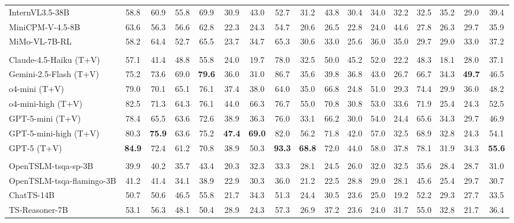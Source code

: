 \documentclass{article}
\theoremstyle{plain}
\theoremstyle{definition}
\theoremstyle{remark}
\theoremstyle{plain}
\begin{document}
\begin{table}[t]
{\begin{tabular}{l|cccc|ccccccc|cc|cc|c}
\rowcolor{green!10}
InternVL3.5-38B & 58.8 & 60.9 & 55.8 & 69.9 & 30.9 & 43.0 & 52.7 & 31.2 & 43.8 & 30.4 & 34.0 & 32.2 & 32.5 & 35.2 & 29.0 & 39.4 \\
\rowcolor{green!10}
MiniCPM-V-4.5-8B & 63.6 & 56.3 & 56.6 & 62.8 & 22.3 & 24.3 & 54.7 & 20.6 & 26.5 & 22.8 & 24.0 & 44.6 & 27.8 & 26.3 & 29.7 & 35.9 \\
\rowcolor{green!10}
MiMo-VL-7B-RL & 58.2 & 64.4 & 52.7 & 65.5 & 23.7 & 34.7 & 65.3 & 30.6 & 33.0 & 25.6 & 36.0 & 35.0 & 29.7 & 29.0 & 33.0 & 37.2 \\
\midrule
\rowcolor{gray!20} \multicolumn{17}{c}{\textit{Both Visual \& Textual Time Series as Input}} \\\midrule
\rowcolor{blue!10}
Claude-4.5-Haiku (T+V) & 57.1 & 41.4 & 48.8 & 55.8 & 24.0 & 19.7 & 78.0 & 32.5 & 50.0 & 45.2 & 52.0 & 22.2 & 48.3 & 18.1 & 28.0 & 37.1 \\
\rowcolor{blue!10}
Gemini-2.5-Flash (T+V) & 75.2 & 73.6 & 69.0 & \textbf{79.6} & 36.0 & 31.0 & 86.7 & 35.6 & 39.8 & 36.8 & 43.0 & 26.7 & 66.7 & 34.3 & \textbf{49.7} & 46.5 \\
\rowcolor{blue!10}
o4-mini (T+V) & 79.0 & 70.1 & 65.1 & 76.1 & 37.4 & 38.0 & 64.0 & 35.0 & 66.8 & 24.8 & 51.0 & 29.3 & 74.4 & 29.9 & 36.0 & 48.2 \\
\rowcolor{blue!10}
o4-mini-high (T+V) & 82.5 & 71.3 & 64.3 & 76.1 & 44.0 & 66.3 & 76.7 & 55.0 & 70.8 & 30.8 & 53.0 & 33.6 & 71.9 & 25.4 & 24.3 & 52.5 \\
\rowcolor{blue!10}
GPT-5-mini (T+V) & 78.4 & 65.5 & 63.6 & 72.6 & 38.9 & 36.3 & 76.0 & 33.1 & 66.2 & 30.0 & 54.0 & 24.4 & 65.6 & 34.3 & 29.7 & 46.9 \\
\rowcolor{blue!10}
GPT-5-mini-high (T+V) & 80.3 & \textbf{75.9} & 63.6 & 75.2 & \textbf{47.4} & \textbf{69.0} & 82.0 & 56.2 & 71.8 & 42.0 & 57.0 & 32.5 & 68.9 & 32.8 & 24.3 & 54.1 \\
\rowcolor{blue!10}
GPT-5 (T+V) & \textbf{84.9} & 72.4 & 61.2 & 70.8 & 38.9 & 50.3 & \textbf{93.3} & \textbf{68.8} & 72.0 & 44.0 & 58.0 & 37.8 & 78.1 & 31.9 & 34.3 & \textbf{55.6} \\
\midrule
\rowcolor{gray!20} \multicolumn{17}{c}{\textit{Embedded Time Series as Input}} \\\midrule
\rowcolor{green!10}
OpenTSLM-tsqa-sp-3B & 39.9 & 40.2 & 35.7 & 43.4 & 20.3 & 32.3 & 33.3 & 28.1 & 24.5 & 26.0 & 32.0 & 32.5 & 35.6 & 28.4 & 28.7 & 31.0 \\
\rowcolor{green!10}
OpenTSLM-tsqa-flamingo-3B & 41.2 & 41.4 & 34.1 & 38.9 & 22.9 & 30.3 & 36.0 & 21.2 & 22.5 & 28.8 & 29.0 & 28.1 & 45.6 & 25.4 & 29.7 & 30.7\\
\rowcolor{green!10}
ChatTS-14B & 50.7 & 50.6 & 46.5 & 55.8 & 21.7 & 34.3 & 51.3 & 24.4 & 30.5 & 23.6 & 25.0 & 19.2 & 52.2 & 29.3 & 27.7 & 33.5 \\
\rowcolor{green!10}
TS-Reasoner-7B & 53.1 & 56.3 & 48.1 & 50.4 & 28.9 & 24.3 & 57.3 & 26.9 & 37.2 & 23.6 & 24.0 & 31.7 & 55.0 & 32.8 & 21.7 & 36.4 \\
\bottomrule
\end{tabular}
}
\label{tab: main result_percent}
\end{table}
\end{document}
